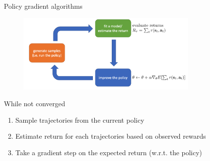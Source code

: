 \documentclass[usenames,dvipsnames,notes,11pt,aspectratio=169,hyperref={colorlinks=true, linkcolor=blue}]{beamer}
\begin{document}
\begin{frame}
    {Policy gradient algorithms}
            \begin{figure}
        \includegraphics[width=0.8\textwidth]{figures/pg}
            \end{figure}

            \vspace{-2em}
            While not converged\\
            \begin{enumerate}
                \item Sample trajectories from the current policy 
                \item Estimate return for each trajectories based on observed rewards
                \item Take a gradient step on the expected return (w.r.t. the policy)
            \end{enumerate}
\end{frame}
\end{document}
